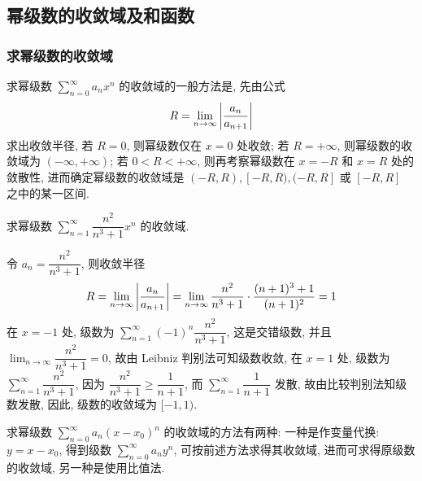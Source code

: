 \subsection{幂级数的收敛域及和函数}

\subsubsection{求幂级数的收敛域}

求幂级数 $\displaystyle\sum_{n=0}^{\infty}a_nx^n$ 的收敛域的一般方法是, 先由公式
$$R=\lim_{n\to\infty}\qty|\dfrac{a_n}{a_{n+1}}|$$
求出收敛半径, 若 $R=0$, 则幂级数仅在 $x=0$ 处收敛; 若 $R=+\infty$, 则幂级数的收敛域为 $(-\infty,+\infty)$;
若 $0<R<+\infty$, 则再考察幂级数在 $x=-R$ 和 $x=R$ 处的敛散性, 进而确定幂级数的收敛域是 $(-R,R),[-R,R),(-R,R]$ 或 $[-R,R]$ 之中的某一区间.

\begin{example}
    求幂级数 $\displaystyle\sum_{n=1}^{\infty}\dfrac{n^2}{n^3+1}x^n$ 的收敛域.
\end{example}
\begin{solution}
    令 $a_n=\dfrac{n^2}{n^3+1}$, 则收敛半径
    $$R=\displaystyle\lim_{n\to\infty}\qty|\dfrac{a_n}{a_{n+1}}|=\lim_{n\to\infty}\dfrac{n^2}{n^3+1}\cdot\dfrac{(n+1)^3+1}{(n+1)^2}=1$$
    在 $x=-1$ 处, 级数为 $\displaystyle\sum_{n=1}^{\infty}(-1)^n\dfrac{n^2}{n^3+1}$, 这是交错级数, 并且 $\displaystyle\lim_{n\to\infty}\dfrac{n^2}{n^3+1}=0$, 故由 Leibniz 判别法可知级数收敛, 
    在 $x=1$ 处, 级数为 $\displaystyle\sum_{n=1}^{\infty}\dfrac{n^2}{n^3+1}$, 因为 $\dfrac{n^2}{n^3+1}\geqslant \dfrac{1}{n+1}$, 
    而 $\displaystyle\sum_{n=1}^{\infty}\dfrac{1}{n+1}$ 发散, 故由比较判别法知级数发散, 因此, 级数的收敛域为 $[-1,1).$
\end{solution}

求幂级数 $\displaystyle\sum_{n=0}^{\infty}a_n(x-x_0)^n$ 的收敛域的方法有两种: 一种是作变量代换: $y=x-x_0$, 
得到级数 $\displaystyle\sum_{n=0}^{\infty}a_ny^n$, 可按前述方法求得其收敛域, 进而可求得原级数的收敛域, 另一种是使用比值法.

